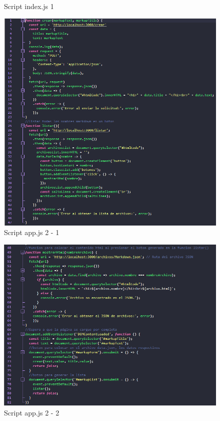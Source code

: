 \documentclass{article}
\begin{document}
\begin{itemize}
\begin{figure}[H]
			\caption{Script index.js 1}
		\end{figure}
		\begin{figure}[H]
			\centering
			\includegraphics[width=1\textwidth,keepaspectratio]{img/Scriptapp1.png}
			\caption{Script app.js 2 - 1}
		\end{figure}
		\begin{figure}[H]
			\centering
			\includegraphics[width=1\textwidth,keepaspectratio]{img/Scriptapp2.png}
			\caption{Script app.js 2 - 2}

\end{figure}
\end{itemize}
\end{document}
